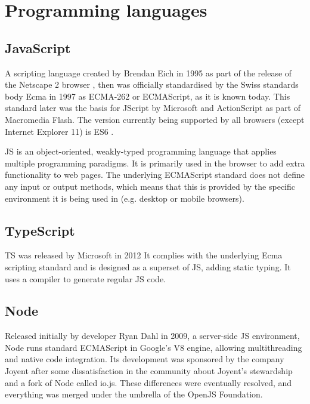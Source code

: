 \section{Programming languages}



\subsection{JavaScript}

A scripting language created by Brendan Eich in 1995 as part of the release of the Netscape 2 browser \parencite{javascriptRelease}, then was officially standardised by the Swiss standards body Ecma in 1997 as ECMA-262 or ECMAScript, as it is known today. This standard later was the basis for JScript by Microsoft and ActionScript as part of Macromedia Flash. The version currently being supported by all browsers (except Internet Explorer 11) is \ac{ES6} \parencite{javascriptHistory}.

\ac{JS} is an object-oriented, weakly-typed programming language that applies multiple programming paradigms. It is primarily used in the browser to add extra functionality to web pages. The underlying ECMAScript standard does not define any input or output methods, which means that this is provided by the specific environment it is being used in (e.g. desktop or mobile browsers).

\subsection{TypeScript}

\ac{TS} was released by Microsoft in 2012  It complies with the underlying Ecma scripting standard and is designed as a superset of \ac{JS}, adding static typing. It uses a compiler to generate regular \ac{JS} code.

\subsection{Node}

Released initially by developer Ryan Dahl in 2009, a server-side \ac{JS} environment, Node runs standard ECMAScript in Google's V8 engine, allowing multithreading and native code integration. Its development was sponsored by the company Joyent after some dissatisfaction in the community about Joyent's stewardship and a fork of Node called io.js. These differences were eventually resolved, and everything was merged under the umbrella of the OpenJS Foundation.

